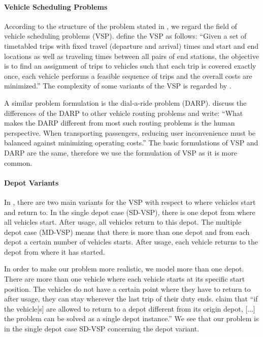 \paragraph{Vehicle Scheduling Problems} \parfill

According to the structure of the problem stated in , we regard the field of vehicle scheduling problems (VSP). \cite{Bunte_Kliewer} define the VSP as follows: \enquote{Given a set of timetabled trips with fixed travel (departure and arrival) times and start and end locations as well as traveling times between all pairs of end stations, the objective is to find an assignment of trips to vehicles such that each trip is covered exactly once, each vehicle performs a feasible sequence of trips and the overall costs are minimized.} The complexity of some variants of the VSP is regarded by \cite{Lenstra_Kan}.

A similar problem formulation is the dial-a-ride problem (DARP). \cite{Cordeau_Laporte} discuss the differences of the DARP to other vehicle routing problems and write: \enquote{What makes the DARP different from most such routing problems is the human perspective. When transporting passengers, reducing user inconvenience must be balanced against minimizing operating costs.} The basic formulations of VSP and DARP are the same, therefore we use the formulation of VSP as it is more common.

\paragraph{Depot Variants} \parfill 

In \cite{Bunte_Kliewer}, there are two main variants for the VSP with respect to where vehicles start and return to. In the single depot case (SD-VSP), there is one depot from where all vehicles start. After usage, all vehicles return to this depot. The multiple depot case (MD-VSP) means that there is more than one depot and from each depot a certain number of vehicles starts. After usage, each vehicle returns to the depot from where it has started. 

In order to make our problem more realistic, we model more than one depot. There are more than one vehicle where each vehicle starts at its specific start position. The vehicles do not have a certain point where they have to return to after usage, \ie they can stay wherever the last trip of their duty ends. \cite{Daduna_Paixao} claim that \enquote{if the vehicle[s] are allowed to return to a depot different from its origin depot, [...] the problem can be solved as a single depot instance.} We see that our problem is in the single depot case SD-VSP concerning the depot variant.

